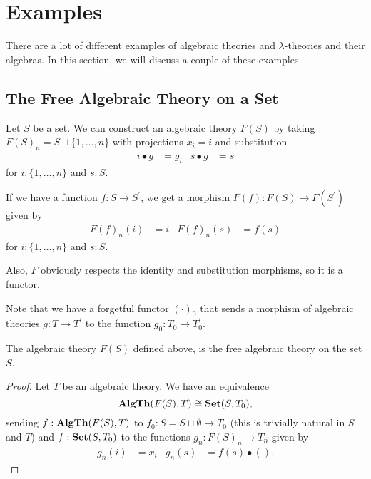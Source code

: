 \section{Examples}\label{sec:algebraic-theory-examples}

There are a lot of different examples of algebraic theories and $ \lambda $-theories and their algebras. In this section, we will discuss a couple of these examples.

\subsection{The Free Algebraic Theory on a Set}
\begin{example}
  Let $ S $ be a set. We can construct an algebraic theory $ F(S) $ by taking $ F(S)_n = S \sqcup \{ 1, \dots, n \} $ with projections $ x_i = i $ and substitution
  \begin{align*}
    i \bullet g &= g_i & s \bullet g &= s
  \end{align*}
  for $ i : \{ 1, \dots, n \} $ and $ s : S $.

  If we have a function $ f: S \to S^\prime $, we get a morphism $ F(f): F(S) \to F(S^\prime) $ given by
  \begin{align*}
    F(f)_n(i) &= i & F(f)_n(s) &= f(s)
  \end{align*}
  for $ i : \{ 1, \dots, n \} $ and $ s : S $.

  Also, $ F $ obviously respects the identity and substitution morphisms, so it is a functor.
\end{example}

Note that we have a forgetful functor $ (\cdot)_0 $ that sends a morphism of algebraic theories $ g: T \to T^\prime $ to the function $ g_0: T_0 \to T^\prime_0 $.

\begin{lemma}
  The algebraic theory $ F(S) $ defined above, is the free algebraic theory on the set $ S $.
\end{lemma}
\begin{proof}
  Let $ T $ be an algebraic theory. We have an equivalence
  \[ \mathbf{AlgTh}(F(S), T) \cong \mathbf{Set}(S, T_0), \]
  sending $ f: \mathbf{AlgTh}(F(S), T) $ to $ f_0: S = S \sqcup \emptyset \to T_0 $ (this is trivially natural in $ S $ and $ T $) and $ f: \mathbf{Set}(S, T_0) $ to the functions $ g_n: F(S)_n \to T_n $ given by
  \begin{align*}
    g_n(i) &= x_i & g_n(s) &= f(s) \bullet ().
  \end{align*}
\end{proof}

